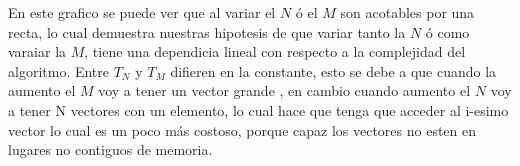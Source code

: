     
     \begin{figure}[H]
         \centering
         \caption{}
         \label{fig:exp1:tiempo_base}
     \end{figure}

     En este grafico se puede ver que al variar el $N$ ó el $M$ son acotables por una recta, lo cual demuestra nuestras hipotesis de que variar tanto la $N$ ó como varaiar la $M$, tiene una dependicia lineal con respecto a la complejidad del algoritmo. Entre $T_N$ y $T_M$ difieren en la constante, esto se debe a que cuando la aumento el $M$ voy a tener un vector grande , en cambio cuando aumento el $N$ voy a tener N vectores con un elemento, lo cual hace que tenga que acceder al i-esimo vector lo cual es un poco más costoso, porque capaz los vectores no esten en lugares no contiguos de memoria. 



